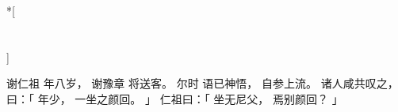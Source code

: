 
\switchcolumn[0]*[\section{}]

谢仁祖
年八岁，
谢豫章
将送客。
尔时
语已神悟，
自参上流。
诸人咸共叹之，曰：「
    年少，
    一坐之颜回。
」
仁祖曰：「
    坐无尼父，
    焉别颜回？
」

\switchcolumn



